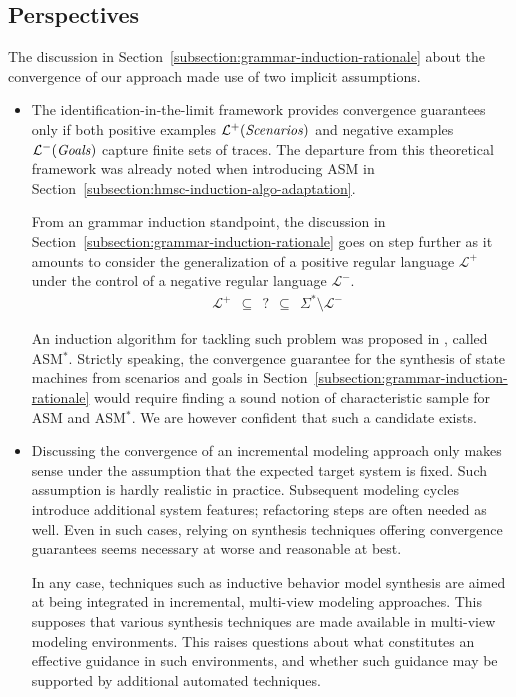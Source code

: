 \subsection{Perspectives}

The discussion in Section~\ref{subsection:grammar-induction-rationale} about the convergence of our approach made use of two implicit assumptions.
\begin{itemize}
\item The identification-in-the-limit framework provides convergence guarantees only if both positive examples $\mathcal{L}^+(\mbox{\emph{Scenarios}})$ and negative examples $\mathcal{L}^-(\mbox{\emph{Goals}})$ capture finite sets of traces. The departure from this theoretical framework was already noted when introducing ASM in Section~\ref{subsection:hmsc-induction-algo-adaptation}.

From an grammar induction standpoint, the discussion in Section~\ref{subsection:grammar-induction-rationale} goes on step further as it amounts to consider the generalization of a positive regular language $\mathcal{L}^+$ under the control of a negative regular language $\mathcal{L}^-$.
\begin{align*}
&\mathcal{L}^+~~\subseteq~~?~~\subseteq~~\Sigma^* \setminus \mathcal{L}^-
\end{align*}

An induction algorithm for tackling such problem was proposed in \cite{Lambeau:2008}, called ASM$^*$. Strictly speaking, the convergence guarantee for the synthesis of state machines from scenarios and goals in Section~\ref{subsection:grammar-induction-rationale} would require finding a sound notion of characteristic sample for ASM and ASM$^*$. We are however confident that such a candidate exists.

\item Discussing the convergence of an incremental modeling approach only makes sense under the assumption that the expected target system is fixed. Such assumption is hardly realistic in practice. Subsequent modeling cycles introduce additional system features; refactoring steps are often needed as well. Even in such cases, relying on synthesis techniques offering convergence guarantees seems necessary at worse and reasonable at best.

In any case, techniques such as inductive behavior model synthesis are aimed at being integrated in incremental, multi-view modeling approaches. This supposes that various synthesis techniques are made available in multi-view modeling environments. This raises questions about what constitutes an effective guidance in such environments, and whether such guidance may be supported by additional automated techniques.


\end{itemize}
